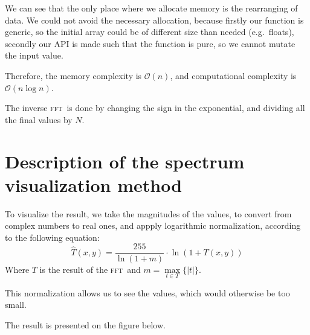 \documentclass[12pt]{article}
\newcommand*{\fft}{\textsc{fft}}
\begin{document}
We can see that the only place where we allocate memory is the rearranging of data.
We could not avoid the necessary allocation, because firstly our function is generic, so the initial array could be of different size than needed (e.g.~floats), secondly our API is made such that the function is pure, so we cannot mutate the input value.

Therefore, the memory complexity is $\mathcal{O}(n)$, and computational complexity is $\mathcal{O}(n \log n)$.

The inverse \fft\ is done by changing the sign in the exponential, and dividing all the final values by $N$. 

\section{Description of the spectrum visualization method}

To visualize the result, we take the magnitudes of the values, to convert from complex numbers to real ones, and appply logarithmic normalization, according to the following equation:
\begin{equation}
    \hat{T}(x,y) = \frac{255}{\ln(1 + m)} \cdot \ln (1 + T(x,y))
\end{equation}
Where $T$ is the result of the \fft\, and $m = \max\limits_{t \in T}\big\{|t|\big\}$.

This normalization allows us to see the values, which would otherwise be too small.

The result is presented on the figure below.
\end{document}

